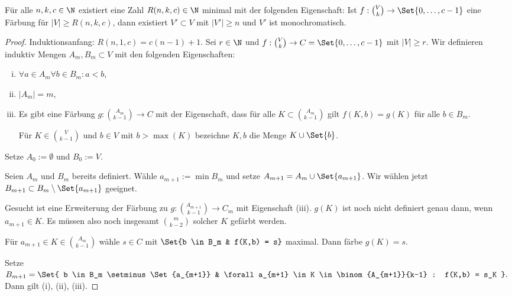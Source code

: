 \begin{st}[Ramsey, 1930]
    Für alle $n, k, c \in \N$ existiert eine Zahl $R(n,k,c) \in \N$ minimal mit der folgenden Eigenschaft:
    Ist $f: \binom{V}{k} \to \Set{0, \dotsc, c-1}$ eine Färbung für $|V| \ge R(n,k,c)$, dann existiert $V' \subset V$ mit $|V'| \ge n$ und $V'$ ist monochromatisch.
    \begin{proof}
        Induktionsanfang:
        \begin{math}
            R(n,1,c) = c(n-1) + 1.
        \end{math}
        Sei $r \in \N$ und $f: \binom{V}{k} \to C = \Set{0, \dotsc, c-1}$ mit $|V| \ge r$.
        Wir definieren induktiv Mengen $A_m, B_m \subset V$ mit den folgenden Eigenschaften:
        \begin{enumerate}[(i)]
            \item
                $\forall a \in A_m \forall b \in B_m: a < b$,
            \item
                $|A_m| = m$,
            \item
                Es gibt eine Färbung $g: \binom{A_m}{k-1} \to C$ mit der Eigenschaft, dass für alle $K \subset \binom{A_m}{k-1}$ gilt $f(K, b) = g(K)$ für alle $b \in B_m$.

                Für $K \in \binom{V}{k-1}$ und $b \in V$ mit $b > \max(K)$ bezeichne $K, b$ die Menge $K \cup \Set{b}$.
        \end{enumerate}
        Setze $A_0 :=  \emptyset$ und $B_0 := V$.

        Seien $A_m$ und $B_m$ bereits definiert.
        Wähle $a_{m+1} := \min B_m$ und setze $A_{m+1} = A_m \cup \Set{a_{m+1}}$.
        Wir wählen jetzt $B_{m+1} \subset B_m \setminus \Set{a_{m+1}}$ geeignet.

        Gesucht ist eine Erweiterung der Färbung zu $g: \binom{A_{m+1}}{k-1} \to C_m$ mit Eigenschaft (iii).
        $g(K)$ ist noch nicht definiert genau dann, wenn $a_{m+1} \in K$.
        Es müssen also noch insgesamt $\binom{m}{k-2}$ solcher $K$ gefärbt werden.

        Für $a_{m+1} \in K \in \binom{A_m}{k-1}$ wähle $s \in C$ mit $\Set{b \in B_m & f(K,b) = s}$ maximal.
        Dann färbe $g(K) = s$.

        Setze
        \begin{math}
            B_{m+1} = \Set{ b \in B_m \setminus \Set{a_{m+1}} & \forall a_{m+1} \in K \in \binom{A_{m+1}}{k-1} : f(K,b) = s_K }.
        \end{math}
        Dann gilt (i), (ii), (iii).


\end{proof}
\end{st}
